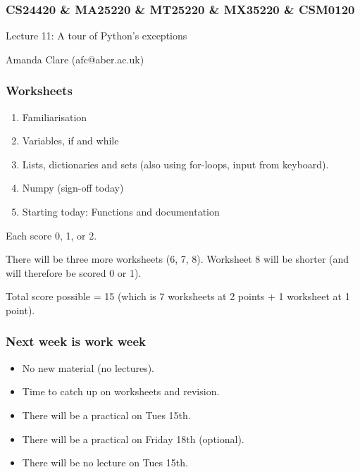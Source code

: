 \documentclass{beamer}
\begin{document}

\begin{frame}
\frametitle{CS24420 \& MA25220 \& MT25220 \& MX35220 \& CSM0120}

\begin{center}
\begin{huge}
Lecture 11: A tour of Python's exceptions
\end{huge}
\bigskip

Amanda Clare (afc@aber.ac.uk)

\end{center}
\end{frame}

\begin{frame}[fragile]
\frametitle{Worksheets}
\begin{enumerate}
\item Familiarisation
\item Variables, if and while
\item Lists, dictionaries and sets (also using for-loops, input from
  keyboard).
\item Numpy (sign-off today)
\pause
\item Starting today: Functions and documentation
\end{enumerate}
\pause
Each score 0, 1, or 2.

There will be three more worksheets (6, 7, 8). Worksheet 8 will be
shorter (and will therefore be scored 0 or 1). 

Total score possible = 15 (which is 7 worksheets at 2 points + 1
worksheet at 1 point). 
\end{frame}

\begin{frame}[fragile]
\frametitle{Next week is work week}
\begin{itemize}
\item No new material (no lectures).
\item Time to catch up on worksheets and revision.
\item There will be a practical on Tues 15th.
\item There will be a practical on Friday 18th (optional).
\item There will be no lecture on Tues 15th.
\end{itemize}
\end{frame}
\end{document}
